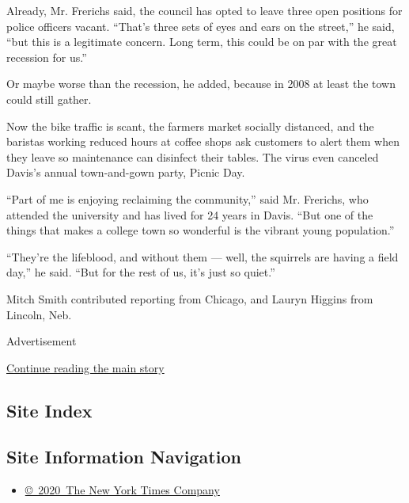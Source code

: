 Already, Mr. Frerichs said, the council has opted to leave three open
positions for police officers vacant. ``That's three sets of eyes and
ears on the street,'' he said, ``but this is a legitimate concern. Long
term, this could be on par with the great recession for us.''

Or maybe worse than the recession, he added, because in 2008 at least
the town could still gather.

Now the bike traffic is scant, the farmers market socially distanced,
and the baristas working reduced hours at coffee shops ask customers to
alert them when they leave so maintenance can disinfect their tables.
The virus even canceled Davis's annual town-and-gown party, Picnic Day.

``Part of me is enjoying reclaiming the community,'' said Mr. Frerichs,
who attended the university and has lived for 24 years in Davis. ``But
one of the things that makes a college town so wonderful is the vibrant
young population.''

``They're the lifeblood, and without them --- well, the squirrels are
having a field day,'' he said. ``But for the rest of us, it's just so
quiet.''

Mitch Smith contributed reporting from Chicago, and Lauryn Higgins from
Lincoln, Neb.

Advertisement

\protect\hyperlink{after-bottom}{Continue reading the main story}

\hypertarget{site-index}{%
\subsection{Site Index}\label{site-index}}

\hypertarget{site-information-navigation}{%
\subsection{Site Information
Navigation}\label{site-information-navigation}}

\begin{itemize}
\tightlist
\item
  \href{https://help.nytimes3xbfgragh.onion/hc/en-us/articles/115014792127-Copyright-notice}{©~2020~The
  New York Times Company}
\end{itemize}

